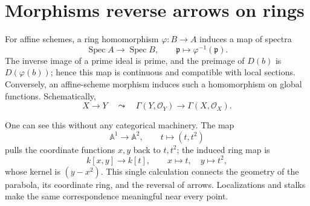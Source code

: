 \section{Morphisms reverse arrows on rings}

For affine schemes, a ring homomorphism \(\varphi:B\to A\) induces a map of spectra
\[
 \operatorname{Spec}A\longrightarrow\operatorname{Spec}B,
 \qquad\mathfrak p\longmapsto\varphi^{-1}(\mathfrak p).
\]
The inverse image of a prime ideal is prime, and the preimage of \(D(b)\) is \(D(\varphi(b))\); hence this map is continuous and compatible with local sections. Conversely, an affine-scheme morphism induces such a homomorphism on global functions. Schematically,
\[
 X\longrightarrow Y\quad\leadsto\quad
 \Gamma(Y,\mathcal O_Y)\longrightarrow\Gamma(X,\mathcal O_X).
\]

One can see this without any categorical machinery. The map
\[
 \mathbb A^1\longrightarrow\mathbb A^2,\qquad t\longmapsto(t,t^2)
\]
pulls the coordinate functions \(x,y\) back to \(t,t^2\); the induced ring map is
\[
 k[x,y]\longrightarrow k[t],\qquad x\mapsto t,\quad y\mapsto t^2,
\]
whose kernel is \((y-x^2)\). This single calculation connects the geometry of the parabola, its coordinate ring, and the reversal of arrows. Localizations and stalks make the same correspondence meaningful near every point.
